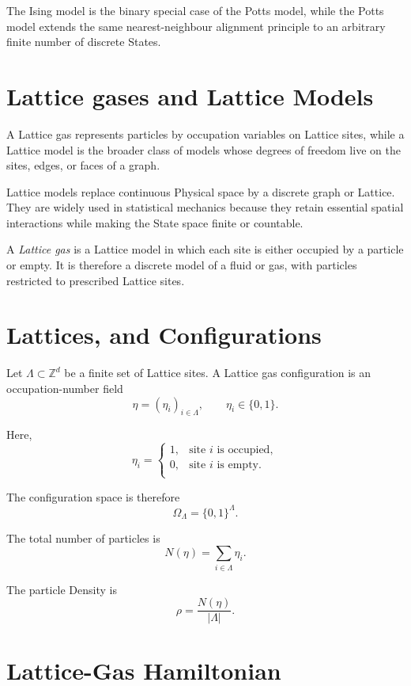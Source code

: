 \documentclass[a4paper, 10pt, onepage]{elegantbook}
\begin{document}
{The Ising model is the binary special case of the Potts model, while the Potts
model extends the same nearest-neighbour alignment principle to an arbitrary
finite number of discrete States.

\newpage



\section{Lattice gases and Lattice Models}

A Lattice gas represents particles by occupation variables on Lattice sites,
 while a Lattice model is the broader class of models whose degrees of freedom live on the sites, edges, or faces of a 
graph.

Lattice models replace continuous Physical space by a discrete graph or Lattice.
They are widely used in statistical mechanics because they retain essential
spatial interactions while making the State space finite or countable.

A \emph{Lattice gas} is a Lattice model in which each site is either occupied by
a particle or empty. It is therefore a discrete model of a fluid or gas, with
particles restricted to prescribed Lattice sites.

\section{Lattices, and Configurations}

Let \(\Lambda\subset\mathbb Z^d\) be a finite set of Lattice sites. A Lattice
gas configuration is an occupation-number field
\[
\eta=(\eta_i)_{i\in\Lambda},
\qquad
\eta_i\in\{0,1\}.
\]

Here,
\[
\eta_i=
\begin{cases}
1, & \text{site } i \text{ is occupied},  \\
0, & \text{site } i \text{ is empty}.  \\
\end{cases}
\]

The configuration space is therefore
\[
\Omega_\Lambda=\{0,1\}^{\Lambda}.
\]

The total number of particles is
\[
N(\eta)=\sum_{i\in\Lambda}\eta_i.
\]

The particle Density is
\[
\rho=\frac{N(\eta)}{|\Lambda|}.
\]

\section{Lattice-Gas Hamiltonian}

}
\end{document}
